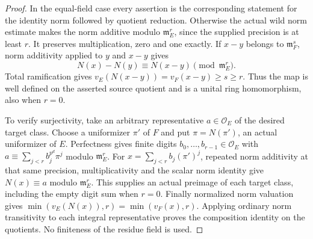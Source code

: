 \begin{proof}
In the equal-field case every assertion is the corresponding statement
for the identity norm followed by quotient reduction. Otherwise the
actual wild norm estimate makes the norm additive modulo
$\mathfrak m_E^r$, since the supplied precision is at least $r$.
It preserves multiplication, zero and one exactly. If $x-y$ belongs
to $\mathfrak m_F^s$, norm additivity applied to $y$ and $x-y$ gives
\[
 N(x)-N(y)\equiv N(x-y)\pmod{\mathfrak m_E^r}.
\]
Total ramification gives $v_E(N(x-y))=v_F(x-y)\geq s\geq r$.
Thus the map is well defined on the asserted source quotient and is
a unital ring homomorphism, also when $r=0$.

To verify surjectivity, take an arbitrary representative
$a\in\mathcal O_E$ of the desired target class. Choose a uniformizer
$\pi'$ of $F$ and put $\pi=N(\pi')$, an actual uniformizer of $E$.
Perfectness gives finite digits $b_0,\ldots,b_{r-1}\in\mathcal O_E$
with $a\equiv\sum_{j<r}b_j^{p^d}\pi^j$ modulo $\mathfrak m_E^r$.
For $x=\sum_{j<r}b_j(\pi')^j$, repeated norm additivity at that same
precision, multiplicativity and the scalar norm identity give
$N(x)\equiv a$ modulo $\mathfrak m_E^r$.
This supplies an actual preimage of each target class, including the
empty digit sum when $r=0$. Finally normalized norm valuation gives
$\min(v_E(N(x)),r)=\min(v_F(x),r)$. Applying ordinary norm
transitivity to each integral representative proves the composition
identity on the quotients. No finiteness of the residue field is used.
\end{proof}

